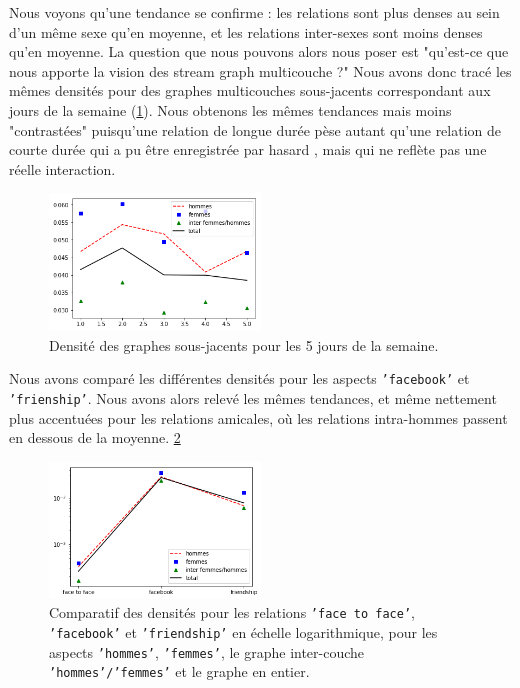 \documentclass[11pt,a4paper]{article}
\theoremstyle{definition}
\theoremstyle{remark}
\theoremstyle{remark}
\def \stgm {stream graph multicouche}
\begin{document}
Nous voyons qu'une tendance se confirme : les relations sont plus denses au sein d'un même sexe qu'en moyenne, et les relations inter-sexes sont moins denses qu'en moyenne. La question que nous pouvons alors nous poser est "qu'est-ce que nous apporte la vision des \stgm{} ?" Nous avons donc tracé les mêmes densités pour des graphes multicouches sous-jacents correspondant aux jours de la semaine (\cref{dsj}). Nous obtenons les mêmes tendances mais moins "contrastées" puisqu'une relation de longue durée \og pèse \fg{} autant qu'une relation de courte durée qui a pu être enregistrée \og par hasard \fg{}, mais qui ne reflète pas une réelle interaction.

\begin{figure}[H]
	\centering
	\includegraphics[width=0.5\textwidth]{densitesj.png}
	\caption{Densité des graphes sous-jacents pour les 5 jours de la semaine.}
	\label{dsj}
\end{figure}

Nous avons comparé les différentes densités pour les aspects \texttt{'facebook'} et \texttt{'frienship'}. Nous avons alors relevé les mêmes tendances, et même nettement plus accentuées pour les relations amicales, où les relations intra-hommes passent en dessous de la moyenne. \cref{comp}

\begin{figure}[H]
	\centering
	\includegraphics[width=0.5\textwidth]{comparatif.png}
	\caption{Comparatif des densités pour les relations \texttt{'face to face'}, \texttt{'facebook'} et \texttt{'friendship'} en échelle logarithmique, pour les aspects \texttt{'hommes'}, \texttt{'femmes'}, le graphe inter-couche \texttt{'hommes'/'femmes'} et le graphe en entier.}
	\label{comp}
\end{figure}  
\end{document}
